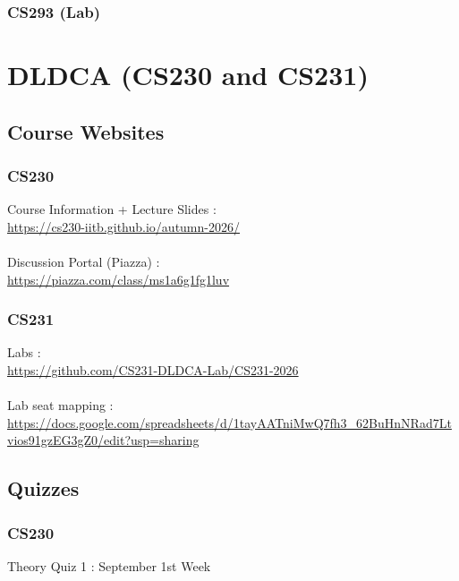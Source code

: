\documentclass{article}
\begin{document}
        \subsubsection{CS293 (Lab)}

    

\pagebreak


\section{DLDCA (CS230 and CS231)}

    \subsection{Course Websites}

        \subsubsection{CS230}
        Course Information + Lecture Slides : \\\url{https://cs230-iitb.github.io/autumn-2026/}\\\\
        Discussion Portal (Piazza) : \\\url{https://piazza.com/class/ms1a6g1fg1luv}

        \subsubsection{CS231}
        Labs : \\
        \url{https://github.com/CS231-DLDCA-Lab/CS231-2026}
        \\\\
        Lab seat mapping : \\\url{https://docs.google.com/spreadsheets/d/1tayAATniMwQ7fh3_62BuHnNRad7Ltvios91gzEG3gZ0/edit?usp=sharing}

        \subsection{Quizzes}

        \subsubsection{CS230}
        Theory Quiz 1 : September 1st Week
\end{document}
